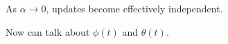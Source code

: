 \begin{frame}[plain]
      As $\alpha \rightarrow 0$, updates become
      effectively independent.
     
      Now can talk about $\phi(t)$ and $\theta(t)$.
    
  


\begin{comment}
  
\section{Appendix}

  \textbf{Threshold contagion on random networks}

  
   
    \alert{First goal:} 
    Find the largest component of vulnerable nodes.
   
    Recall that for finding the giant component's size, 
    we had to solve:
    $$
    {
      F_{\pi}(x)
      =
      x F_{P}
      \left(
        F_{\rho} (x)
      \right)
    }
    \mbox{\ \  and \ }
    {
      F_{\rho}(x)
      =
      x F_{R}
      \left(
        F_{\rho} (x)
      \right)
    }
    $$
   
    We'll find a similar result for 
    the subset of nodes that are vulnerable.
   
    This is a node-based percolation problem.
   
    For a general monotonic threshold distribution \alert{$f(\phi)$},
    a degree $k$ node is vulnerable with probability
    $$
    \infprob_{k1} = \int_{0}^{1/k} f(\phi) \dee{\phi}.
    $$
  


  \textbf{Threshold contagion on random networks}

  
  
    Everything now revolves around the \alert{modified} generating function:
    $$
    F_P^{(\vuln)}(x) 
    = 
    \sum_{k=0}^{\infty}
    \infprob_{k1}
    P_k
    x^k.
    $$
  
    Generating function for friends-of-friends distribution is
    related in same way as before:
    $$
    F_R^{(\vuln)}(x) 
    = 
    \frac{
      \diff{}{x}{F}_P^{(\vuln)}(x)}
    {\diff{}{x} {F}_P^{(\vuln)}(x)|_{x=1}}.
    $$
  


  \textbf{Threshold contagion on random networks}


\end{comment}
\end{frame}
